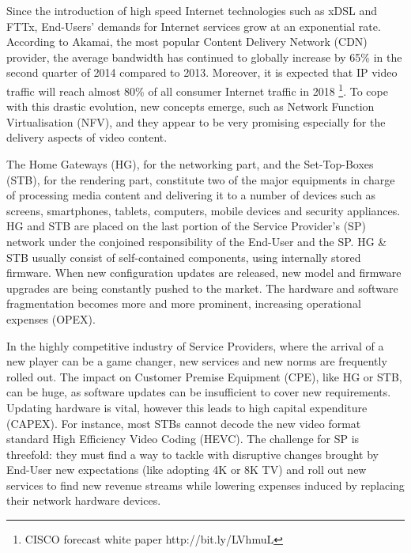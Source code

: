 Since the introduction of high speed Internet technologies such as xDSL and FTTx, End-Users' demands for Internet services grow at an exponential rate.
According to Akamai, the most popular Content Delivery Network (CDN) provider, the average bandwidth has continued to globally increase by 65\% in the second quarter of 2014 \cite{_akamais_2014} compared to 2013. 
Moreover, it is expected that IP video traffic will reach almost 80\% of all consumer Internet traffic in 2018 \footnote{CISCO forecast white paper http://bit.ly/LVhmuL }. To cope with this drastic evolution, new concepts emerge, such as Network Function Virtualisation (NFV), and they appear to be very promising especially for the delivery aspects of video content.

The Home Gateways (HG), for the networking part, and the Set-Top-Boxes (STB), for the rendering part, constitute two of the major equipments in charge of processing media content and delivering it to a number of devices such as screens, smartphones, tablets, computers, mobile devices and security appliances.
HG and STB are placed on the last portion of the Service Provider's (SP) network under the conjoined responsibility of the End-User and the SP.
HG \& STB usually consist of self-contained components, using internally stored firmware.
When new configuration updates are released, new model and firmware upgrades are being constantly pushed to the market.
The hardware and software fragmentation becomes more and more prominent, increasing operational expenses (OPEX). 

In the highly competitive industry of Service Providers, where the arrival of a new player can be a game changer, new services and new norms are frequently rolled out.	
The impact on Customer Premise Equipment (CPE), like HG or STB, can be huge, as software updates can be insufficient to cover new requirements.
Updating hardware is vital, however this leads to high capital expenditure (CAPEX).
For instance, most STBs cannot decode the new video format standard  High Efficiency Video Coding (HEVC). 
The challenge for SP is threefold: they must find a way to tackle with disruptive changes brought by End-User new expectations (like adopting 4K or 8K TV) and roll out new services to find new revenue streams while lowering expenses induced by replacing their network hardware devices.

